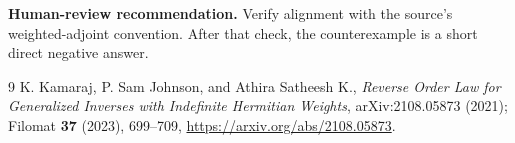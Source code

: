 \documentclass[11pt]{article}
\begin{document}
\textbf{Human-review recommendation.} Verify alignment with the source's
weighted-adjoint convention.  After that check, the counterexample is a short
direct negative answer.

\begin{thebibliography}{9}
K. Kamaraj, P. Sam Johnson, and Athira Satheesh K.,
\emph{Reverse Order Law for Generalized Inverses with Indefinite Hermitian
Weights}, arXiv:2108.05873 (2021); Filomat \textbf{37} (2023), 699--709,
\url{https://arxiv.org/abs/2108.05873}.
\end{thebibliography}
\end{document}
